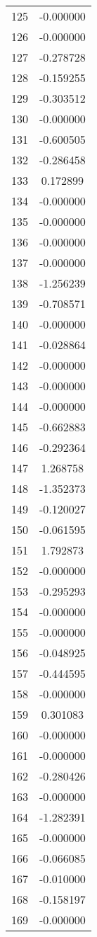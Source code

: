 \documentclass[12pt]{article}
\begin{document}
\begin{longtable}{@{}cc@{}}
125 & -0.000000 \\
126 & -0.000000 \\
127 & -0.278728 \\
128 & -0.159255 \\
129 & -0.303512 \\
130 & -0.000000 \\
131 & -0.600505 \\
132 & -0.286458 \\
133 & 0.172899 \\
134 & -0.000000 \\
135 & -0.000000 \\
136 & -0.000000 \\
137 & -0.000000 \\
138 & -1.256239 \\
139 & -0.708571 \\
140 & -0.000000 \\
141 & -0.028864 \\
142 & -0.000000 \\
143 & -0.000000 \\
144 & -0.000000 \\
145 & -0.662883 \\
146 & -0.292364 \\
147 & 1.268758 \\
148 & -1.352373 \\
149 & -0.120027 \\
150 & -0.061595 \\
151 & 1.792873 \\
152 & -0.000000 \\
153 & -0.295293 \\
154 & -0.000000 \\
155 & -0.000000 \\
156 & -0.048925 \\
157 & -0.444595 \\
158 & -0.000000 \\
159 & 0.301083 \\
160 & -0.000000 \\
161 & -0.000000 \\
162 & -0.280426 \\
163 & -0.000000 \\
164 & -1.282391 \\
165 & -0.000000 \\
166 & -0.066085 \\
167 & -0.010000 \\
168 & -0.158197 \\
169 & -0.000000 \\

\end{longtable}
\end{document}
